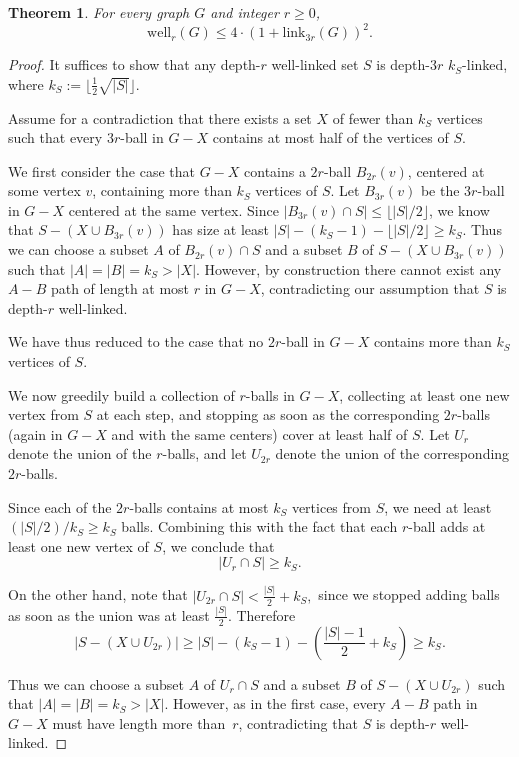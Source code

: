 \documentclass[final]{dmtcs-episciences}
\newtheorem{thm}{Theorem}
\theoremstyle{definition}
\theoremstyle{remark}
\newcommand{\dep}{depth}
\newcommand{\link}{\ensuremath{\mathrm{link}}}
\newcommand{\WL}{\ensuremath{\mathrm{well}}}
\renewcommand{\leq}{\leqslant}
\renewcommand{\geq}{\geqslant}
\begin{document}
\begin{thm}
For every graph $G$ and integer $r\geq 0$,
$$\WL_r(G) \leq 4 \cdot (1+\link_{3r}(G))^2.$$
\end{thm}
\begin{proof}
It suffices to show that any \dep-$r$ well-linked set $S$ is \dep-$3r$ $k_S$-linked, where $k_S:=\lfloor \tfrac{1}{2}\sqrt{|S|} \rfloor$.

Assume for a contradiction that there exists a set $X$ of fewer than $k_S$ vertices such that every $3r$-ball in $G-X$ contains at most half of the vertices of $S$.

\smallskip
We first consider the case that $G-X$ contains a $2r$-ball $B_{2r}(v)$, centered at some vertex $v$, containing more than $k_S$ vertices of $S$. Let $B_{3r}(v)$ be the $3r$-ball in $G-X$ centered at the same vertex. Since $|B_{3r}(v)\cap S|\leq \lfloor |S|/2 \rfloor $, we know that $S-(X \cup B_{3r}(v))$ has size at least  $|S| - (k_S-1)- \lfloor |S|/2 \rfloor \geq k_S$.
Thus we can choose a subset $A$ of $B_{2r}(v)\cap S$ and a subset $B$ of $S-(X \cup B_{3r}(v))$ such that $|A|=|B|=k_S>|X|$. However, by construction there cannot exist any $A-B$ path of length at most $r$ in $G-X$, contradicting our assumption that $S$ is \dep-$r$ well-linked.

\smallskip
 We have thus reduced to the case that no $2r$-ball in $G-X$ contains more than $k_S$ vertices of $S$.

 \smallskip
 
We now greedily build a collection of $r$-balls in $G-X$, collecting at least one new vertex from $S$ at each step, and stopping as soon as the corresponding $2r$-balls (again in $G-X$ and with the same centers) cover at least half of $S$. Let $U_{r}$ denote the union of the $r$-balls, and let $U_{2r}$ denote the union of the corresponding $2r$-balls. 



Since each of the $2r$-balls contains at most $k_S$ vertices from $S$, we need at least $(|S|/2) / k_S \geq k_S$ balls. Combining this with the fact that each $r$-ball adds at least one new vertex of $S$, we conclude that 
$$|U_{r} \cap S| \geq k_S.$$


On the other hand, note that 
$|U_{2r} \cap S| < \frac{|S|}{2} + k_S,$ since we stopped adding balls as soon as the union was at least $\frac{|S|}{2}$.
Therefore
$$|S- (X \cup U_{2r})| \geq |S|-(k_S-1)- \left( \frac{|S|-1}{2} + k_S  \right) \geq k_S.$$

Thus we can choose a subset $A$ of $U_{r} \cap S$ and a subset $B$ of $S- (X \cup U_{2r})$ such that $|A|=|B|=k_S> |X|$. However, as in the first case, every $A-B$ path in $G-X$ must have length more than~$r$, contradicting that $S$ is \dep-$r$ well-linked.
\end{proof}
\end{document}
